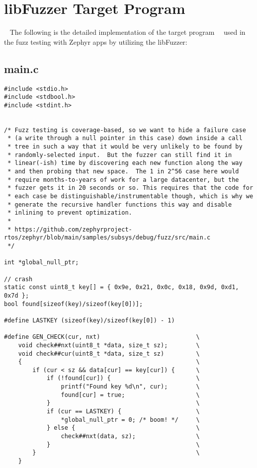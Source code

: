 
\chapter{libFuzzer Target Program}~\label{appx:second}
The following is the detailed implementation of the
target program~\cite{FuzzingE54:online}~\cite{zephyrsa35:online} used in
the fuzz testing with Zephyr apps by utilizing the libFuzzer:

\section*{main.c}
\begin{verbatim}
#include <stdio.h>
#include <stdbool.h>
#include <stdint.h>


/* Fuzz testing is coverage-based, so we want to hide a failure case
 * (a write through a null pointer in this case) down inside a call
 * tree in such a way that it would be very unlikely to be found by
 * randomly-selected input.  But the fuzzer can still find it in
 * linear(-ish) time by discovering each new function along the way
 * and then probing that new space.  The 1 in 2^56 case here would
 * require months-to-years of work for a large datacenter, but the
 * fuzzer gets it in 20 seconds or so. This requires that the code for
 * each case be distinguishable/instrumentable though, which is why we
 * generate the recursive handler functions this way and disable
 * inlining to prevent optimization.
 *
 * https://github.com/zephyrproject-rtos/zephyr/blob/main/samples/subsys/debug/fuzz/src/main.c
 */

int *global_null_ptr;

// crash
static const uint8_t key[] = { 0x9e, 0x21, 0x0c, 0x18, 0x9d, 0xd1, 0x7d };
bool found[sizeof(key)/sizeof(key[0])];

#define LASTKEY (sizeof(key)/sizeof(key[0]) - 1)

#define GEN_CHECK(cur, nxt)                           \
    void check##nxt(uint8_t *data, size_t sz);        \
    void check##cur(uint8_t *data, size_t sz)         \
    {                                                 \
        if (cur < sz && data[cur] == key[cur]) {      \
            if (!found[cur]) {                        \
                printf("Found key %d\n", cur);        \
                found[cur] = true;                    \
            }                                         \
            if (cur == LASTKEY) {                     \
                *global_null_ptr = 0; /* boom! */     \
            } else {                                  \
                check##nxt(data, sz);                 \
            }                                         \
        }                                             \
    }


\end{verbatim}
